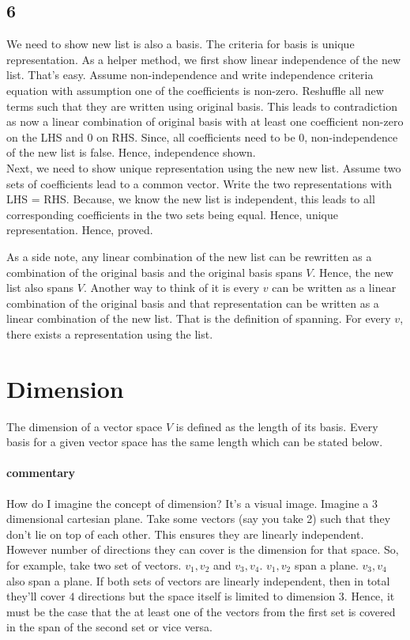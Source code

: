 \documentclass{report}
\begin{document}
\subsection*{6}
We need to show new list is also a basis. The criteria for basis is unique representation. As a helper method, we first show linear independence of the new list. That's easy. Assume non-independence and write independence criteria equation with assumption one of the coefficients is non-zero. Reshuffle all new terms such that they are written using original basis. This leads to contradiction as now a linear combination of original basis with at least one coefficient non-zero on the LHS and 0 on RHS. Since, all coefficients need to be 0, non-independence of the new list is false. Hence, independence shown.\\
Next, we need to show unique representation using the new new list. Assume two sets of coefficients lead to a common vector. Write the two representations with LHS = RHS. Because, we know the new list is independent, this leads to all corresponding coefficients in the two sets being equal. Hence, unique representation. Hence, proved. 

As a side note, any linear combination of the new list can be rewritten as a combination of the original basis and the original basis spans $V$. Hence, the new list also spans $V$. Another way to think of it is every $v$ can be written as a linear combination of the original basis and that representation can be written as a linear combination of the new list. That is the definition of spanning. For every $v$, there exists a representation using the list.


\section{Dimension}
The dimension of a vector space $V$ is defined as the length of its basis. Every basis for a given vector space has the same length which can be stated below. 
\paragraph{commentary} How do I imagine the concept of dimension? It's a visual image. Imagine a 3 dimensional cartesian plane. Take some vectors (say you take 2) such that they don't lie on top of each other. This ensures they are linearly independent. However number of directions they can cover is the dimension for that space. So, for example, take two set of vectors. $v_1,v_2$ and $v_3,v_4$. $v_1,v_2$ span a plane. $v_3,v_4$ also span a plane. If both sets of vectors are linearly independent, then in total they'll cover $4$ directions but the space itself is limited to dimension $3$. Hence, it must be the case that the at least one of the vectors from the first set is covered in the span of the second set or vice versa. 
\end{document}

